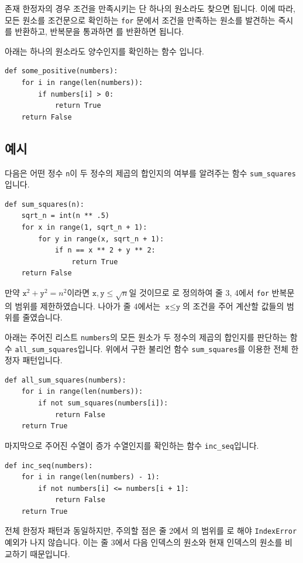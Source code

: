 \documentclass[../main.tex]{subfiles}
\begin{document}
존재 한정자의 경우 조건을 만족시키는 단 하나의 원소라도 찾으면 됩니다.
이에 따라, 모든 원소를 조건문으로 확인하는 \texttt{for} 문에서 조건을 만족하는 원소를 발견하는 즉시 를 반환하고, 반복문을 통과하면 를 반환하면 됩니다.

아래는 하나의 원소라도 양수인지를 확인하는 함수 입니다.
\begin{verbatim}
def some_positive(numbers):
    for i in range(len(numbers)):
        if numbers[i] > 0:
            return True
    return False
\end{verbatim}

\subsection{예시}
다음은 어떤 정수 \texttt{n}이 두 정수의 제곱의 합인지의 여부를 알려주는 함수 \texttt{sum\_squares}입니다.
\begin{verbatim}
def sum_squares(n):
    sqrt_n = int(n ** .5)
    for x in range(1, sqrt_n + 1):
        for y in range(x, sqrt_n + 1):
            if n == x ** 2 + y ** 2:
                return True
    return False
\end{verbatim}
만약 $\texttt{x}^2 + \texttt{y}^2 = n^2$이라면 $\texttt{x}, \texttt{y} \leq \sqrt n$일 것이므로 로 정의하여 줄 3, 4에서 \texttt{for} 반복문의 범위를 제한하였습니다.
나아가 줄 4에서는 $\texttt{x} \leq \texttt{y}$의 조건을 주어 계산할 값들의 범위를 줄였습니다.

아래는 주어진 리스트 \texttt{numbers}의 모든 원소가 두 정수의 제곱의 합인지를 판단하는 함수 \texttt{all\_sum\_squares}입니다.
위에서 구한 불리언 함수 \texttt{sum\_squares}를 이용한 전체 한정자 패턴입니다.
\begin{verbatim}
def all_sum_squares(numbers):
    for i in range(len(numbers)):
        if not sum_squares(numbers[i]):
            return False
    return True
\end{verbatim}

마지막으로 주어진 수열이 증가 수열인지를 확인하는 함수 \texttt{inc\_seq}입니다.
\begin{verbatim}
def inc_seq(numbers):
    for i in range(len(numbers) - 1):
        if not numbers[i] <= numbers[i + 1]:
            return False
    return True
\end{verbatim}
전체 한정자 패턴과 동일하지만, 주의할 점은 줄 2에서 의 범위를 로 해야 \texttt{IndexError} 예외가 나지 않습니다.
이는 줄 3에서 다음 인덱스의 원소와 현재 인덱스의 원소를 비교하기 때문입니다.
\end{document}
